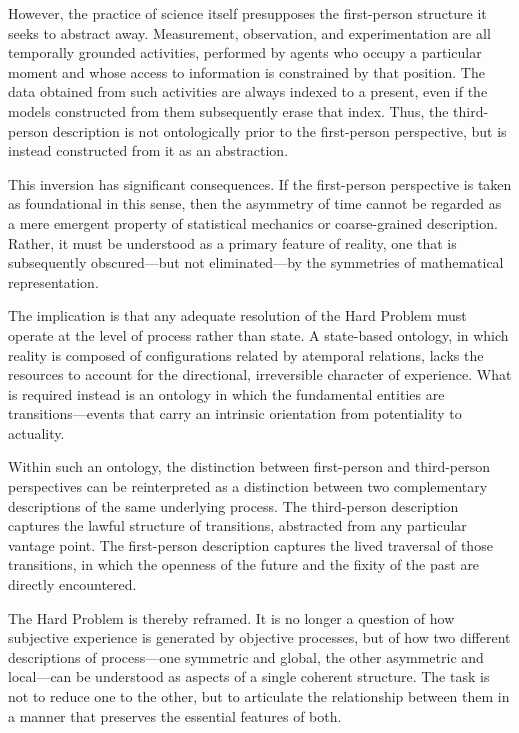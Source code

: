 \documentclass[11pt,a4paper]{article}
\theoremstyle{definition}
\theoremstyle{remark}
\begin{document}
However, the practice of science itself presupposes the first-person structure it seeks to abstract away. Measurement, observation, and experimentation are all temporally grounded activities, performed by agents who occupy a particular moment and whose access to information is constrained by that position. The data obtained from such activities are always indexed to a present, even if the models constructed from them subsequently erase that index. Thus, the third-person description is not ontologically prior to the first-person perspective, but is instead constructed from it as an abstraction.

This inversion has significant consequences. If the first-person perspective is taken as foundational in this sense, then the asymmetry of time cannot be regarded as a mere emergent property of statistical mechanics or coarse-grained description. Rather, it must be understood as a primary feature of reality, one that is subsequently obscured---but not eliminated---by the symmetries of mathematical representation.

The implication is that any adequate resolution of the Hard Problem must operate at the level of process rather than state. A state-based ontology, in which reality is composed of configurations related by atemporal relations, lacks the resources to account for the directional, irreversible character of experience. What is required instead is an ontology in which the fundamental entities are transitions---events that carry an intrinsic orientation from potentiality to actuality.

Within such an ontology, the distinction between first-person and third-person perspectives can be reinterpreted as a distinction between two complementary descriptions of the same underlying process. The third-person description captures the lawful structure of transitions, abstracted from any particular vantage point. The first-person description captures the lived traversal of those transitions, in which the openness of the future and the fixity of the past are directly encountered.

The Hard Problem is thereby reframed. It is no longer a question of how subjective experience is generated by objective processes, but of how two different descriptions of process---one symmetric and global, the other asymmetric and local---can be understood as aspects of a single coherent structure. The task is not to reduce one to the other, but to articulate the relationship between them in a manner that preserves the essential features of both.
\end{document}
